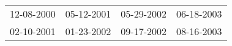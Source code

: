 \begin{supertabular}{llll}
 12-08-2000 &  05-12-2001 &  05-29-2002 &  06-18-2003 \\
 02-10-2001 &  01-23-2002 &  09-17-2002 &  08-16-2003 \\
\end{supertabular}
